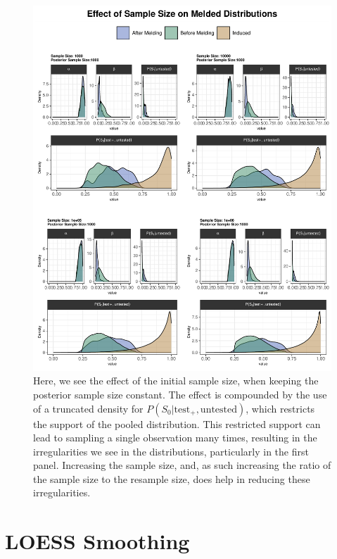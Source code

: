 \documentclass[12pt,twoside]{smiththesis}
\begin{document}
\begin{figure}

{\centering \includegraphics[width=1\linewidth]{figure/effect-truncation} 

}

\caption{\label{fig:trunc} Here, we see the effect of the initial sample size, when keeping the posterior sample size constant. The effect is compounded by the use of a truncated density for $P(S_0|\text{test}_+,\text{untested})$, which restricts the support of the pooled distribution. This restricted support can lead to sampling a single observation many times, resulting in the irregularities we see in the distributions, particularly in the first panel. Increasing the sample size, and, as such increasing the ratio of the sample size to the resample size, does help in reducing these irregularities.}\label{fig:unnamed-chunk-29}
\end{figure}
\newpage

\hypertarget{loess-smoothing}{%
\section{LOESS Smoothing}\label{loess-smoothing}}
\end{document}
